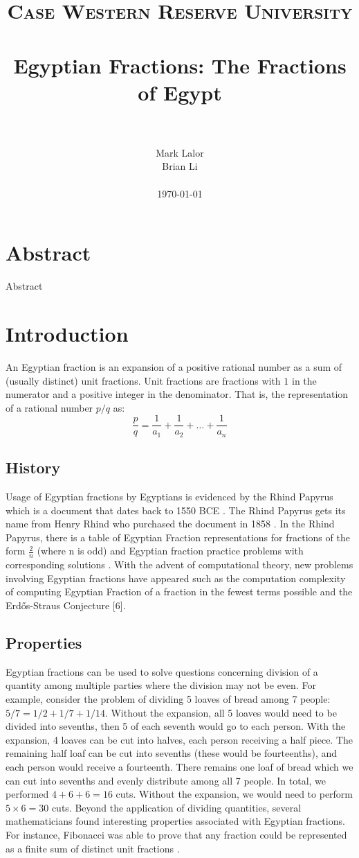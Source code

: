 \documentclass[paper=a4, fontsize=11pt]{scrartcl}
\title{
		\usefont{OT1}{bch}{b}{n}
		\normalfont \normalsize \textsc{Case Western Reserve University} \\ [25pt]
		\horrule{0.5pt} \\[0.4cm]
		\huge Egyptian Fractions: The Fractions of Egypt \\
		\horrule{2pt} \\[0.5cm]
}
\author{
		\normalfont 			\normalsize
        Mark Lalor\\[-3pt]		\normalsize
        Brian Li\\[-3pt]		\normalsize
        \\
        \today
}
\date{}
\numberwithin{equation}{section}	 %
\numberwithin{figure}{section}	 %
\numberwithin{table}{section}	 %
\begin{document}
\maketitle
\section{Abstract}
Abstract
\section{Introduction}
An Egyptian fraction is an expansion of a positive rational number as a sum of (usually distinct) unit fractions. Unit fractions are fractions with $1$ in the numerator and a positive integer in the denominator. That is, the representation of a rational number $p/q$ as:
\begin{equation}
	\frac{p}{q} = \frac{1}{a_1} + \frac{1}{a_2} + \ldots + \frac{1}{a_n}
\end{equation}
\subsection{History}
Usage of Egyptian fractions by Egyptians is evidenced by the Rhind Papyrus which is a document that dates back to 1550 BCE \cite{imhausen}. The Rhind Papyrus gets its name from Henry Rhind who purchased the document in 1858 \cite{imhausen}. In the Rhind Papyrus, there is a table of Egyptian Fraction representations for fractions of the form $\frac{2}{n}$ (where n is odd) and Egyptian fraction practice problems with corresponding solutions \cite{imhausen}. With the advent of computational theory, new problems involving Egyptian fractions have appeared such as the computation complexity of computing Egyptian Fraction of a fraction in the fewest terms possible and the Erd\H{o}s-Straus Conjecture [6].
\subsection{Properties}
Egyptian fractions can be used to solve questions concerning division of a quantity among multiple parties where the division may not be even. For example, consider the problem of dividing 5 loaves of bread among 7 people: $5/7 = 1/2 + 1/7 + 1/14$. Without the expansion, all 5 loaves would need to be divided into sevenths, then 5 of each seventh would go to each person. With the expansion, 4 loaves can be cut into halves, each person receiving a half piece. The remaining half loaf can be cut into sevenths (these would be fourteenths), and each person would receive a fourteenth. There remains one loaf of bread which we can cut into sevenths and evenly distribute among all 7 people. In total, we performed $4 + 6 + 6 = 16$ cuts. Without the expansion, we would need to perform $5 \times 6 = 30$ cuts. Beyond the application of dividing quantities, several mathematicians found interesting properties associated with Egyptian fractions. For instance, Fibonacci was able to prove that any fraction could be represented as a finite sum of distinct unit fractions \cite{dunton}. 
\end{document}

